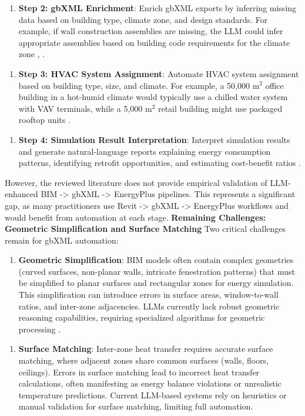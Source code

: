 \documentclass[12pt,a4paper]{article}
\begin{document}
\begin{enumerate}[resume]
  \item \textbf{Step 2: gbXML Enrichment}: Enrich gbXML exports by inferring missing data based on building type, climate zone, and design standards. For example, if wall construction assemblies are missing, the LLM could infer appropriate assemblies based on building code requirements for the climate zone \cite{ref123}, \cite{ref69}.
\end{enumerate}
\begin{enumerate}[resume]
  \item \textbf{Step 3: HVAC System Assignment}: Automate HVAC system assignment based on building type, size, and climate. For example, a 50,000 m$^2$ office building in a hot-humid climate would typically use a chilled water system with VAV terminals, while a 5,000 m$^2$ retail building might use packaged rooftop units \cite{ref70}.
\end{enumerate}
\begin{enumerate}[resume]
  \item \textbf{Step 4: Simulation Result Interpretation}: Interpret simulation results and generate natural-language reports explaining energy consumption patterns, identifying retrofit opportunities, and estimating cost-benefit ratios \cite{ref36}.
\end{enumerate}
However, the reviewed literature does not provide empirical validation of LLM-enhanced BIM -> gbXML -> EnergyPlus pipelines. This represents a significant gap, as many practitioners use Revit -> gbXML -> EnergyPlus workflows and would benefit from automation at each stage.
\textbf{Remaining Challenges: Geometric Simplification and Surface Matching}
Two critical challenges remain for gbXML automation:
\begin{enumerate}
  \item \textbf{Geometric Simplification}: BIM models often contain complex geometries (curved surfaces, non-planar walls, intricate fenestration patterns) that must be simplified to planar surfaces and rectangular zones for energy simulation. This simplification can introduce errors in surface areas, window-to-wall ratios, and inter-zone adjacencies. LLMs currently lack robust geometric reasoning capabilities, requiring specialized algorithms for geometric processing \cite{ref67}.
\end{enumerate}
\begin{enumerate}[resume]
  \item \textbf{Surface Matching}: Inter-zone heat transfer requires accurate surface matching, where adjacent zones share common surfaces (walls, floors, ceilings). Errors in surface matching lead to incorrect heat transfer calculations, often manifesting as energy balance violations or unrealistic temperature predictions. Current LLM-based systems rely on heuristics or manual validation for surface matching, limiting full automation.
\end{enumerate}
\end{document}
